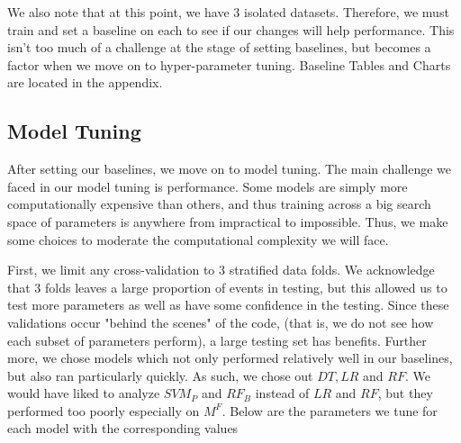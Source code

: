 \documentclass[12pt, a4paper]{article} %
\begin{document}
We also note that at this point, we have 3 isolated datasets. Therefore, we must train and set a baseline on each to see if our changes will help performance. This isn't too much of a challenge at the stage of setting baselines, but becomes a factor when we move on to hyper-parameter tuning. Baseline Tables and Charts are located in the appendix.

\subsection{Model Tuning}

After setting our baselines, we move on to model tuning. The main challenge we faced in our model tuning is performance. Some models are simply more computationally expensive than others, and thus training across a big search space of parameters is anywhere from impractical to impossible. Thus, we make some choices to moderate the computational complexity we will face. 

First, we limit any cross-validation to 3 stratified data folds. We acknowledge that 3 folds leaves a large proportion of events in testing, but this allowed us to test more parameters as well as have some confidence in the testing. Since these validations occur "behind the scenes" of the code, (that is, we do not see how each subset of parameters perform), a large testing set has benefits. Further more, we chose models which not only performed relatively well in our baselines, but also ran particularly quickly. As such, we chose out $DT, LR$ and $RF$. We would have liked to analyze $SVM_P$ and $RF_B$ instead of $LR$ and $RF$, but they performed too poorly especially on $M^{F}$. Below are the parameters we tune for each model with the corresponding values
\end{document}
